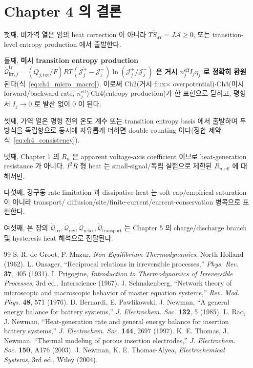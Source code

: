 \documentclass[11pt,a4paper]{article}
\newcommand{\eff}{\mathrm{eff}}
\newcommand{\tot}{\mathrm{tot}}
\newcommand{\irr}{\mathrm{irr}}
\newcommand{\rev}{\mathrm{rev}}
\newcommand{\rlx}{\mathrm{relax}}
\newcommand{\tr}{\mathrm{tr}}
\newcommand{\transp}{\mathrm{transport}}
\begin{document}
\section{Chapter 4 의 결론}\label{sec:ch4_concl}
첫째, 비가역 열은 임의 heat correction 이 아니라 $T\dot S_{\irr}=J\mathcal A\ge0$, 또는 transition-level
entropy production 에서 출발한다.

둘째, \textbf{미시 transition entropy production $\dot{\mathcal Q}_{\irr,j}^{\tr}=(Q_{j,\tot}/F)RT(\mathcal J_j^+-\mathcal J_j^-)\ln(\mathcal J_j^+/\mathcal J_j^-)$
은 거시 $n_j^{\eff}I_j\eta_j$ 로 정확히 환원}된다(식~\eqref{eq:ch4_micro_macro}). 이로써 Ch2(거시 flux$\times$
overpotential)$\cdot$Ch3(미시 forward/backward rate, $n_j^{\eff}$)$\cdot$Ch4(entropy production)가 한 표현으로
닫히고, 평형서 $I_j\to0$ 로 발산 없이 0 이 된다.

셋째, 가역 열은 평형 전위 온도 계수 또는 transition entropy basis 에서 출발하며 두 방식을 독립항으로 동시에
자유롭게 더하면 double counting 이다(정합 제약 식~\eqref{eq:ch4_consistency}).

넷째, Chapter 1 의 $R_n$ 은 apparent voltage-axis coefficient 이므로 heat-generation resistance 가 아니다.
$I^2R$ 형 heat 는 small-signal/독립 실험으로 제한된 $R_{n,\eff}$ 에 대해서만.

다섯째, 강구동 rate limitation 과 dissipative heat 는 soft cap/empirical saturation 이 아니라 transport/
diffusion/site/finite-current/current-conservation 병목으로 표현한다.

여섯째, 본 장의 $\dot{\mathcal Q}_{\irr},\dot{\mathcal Q}_{\rev},\dot{\mathcal Q}_{\rlx},\dot{\mathcal Q}_{\transp}$
는 Chapter 5 의 charge/discharge branch 및 hysteresis heat 해석으로 전달된다.

\begin{thebibliography}{99}
 S. R. de Groot, P. Mazur, \emph{Non-Equilibrium Thermodynamics}, North-Holland (1962).
 L. Onsager, ``Reciprocal relations in irreversible processes,'' \emph{Phys. Rev.} \textbf{37}, 405 (1931).
 I. Prigogine, \emph{Introduction to Thermodynamics of Irreversible Processes}, 3rd ed., Interscience (1967).
 J. Schnakenberg, ``Network theory of microscopic and macroscopic behavior of master equation systems,'' \emph{Rev. Mod. Phys.} \textbf{48}, 571 (1976).
 D. Bernardi, E. Pawlikowski, J. Newman, ``A general energy balance for battery systems,'' \emph{J. Electrochem. Soc.} \textbf{132}, 5 (1985).
 L. Rao, J. Newman, ``Heat-generation rate and general energy balance for insertion battery systems,'' \emph{J. Electrochem. Soc.} \textbf{144}, 2697 (1997).
 K. E. Thomas, J. Newman, ``Thermal modeling of porous insertion electrodes,'' \emph{J. Electrochem. Soc.} \textbf{150}, A176 (2003).
 J. Newman, K. E. Thomas-Alyea, \emph{Electrochemical Systems}, 3rd ed., Wiley (2004).
\end{thebibliography}
\end{document}
